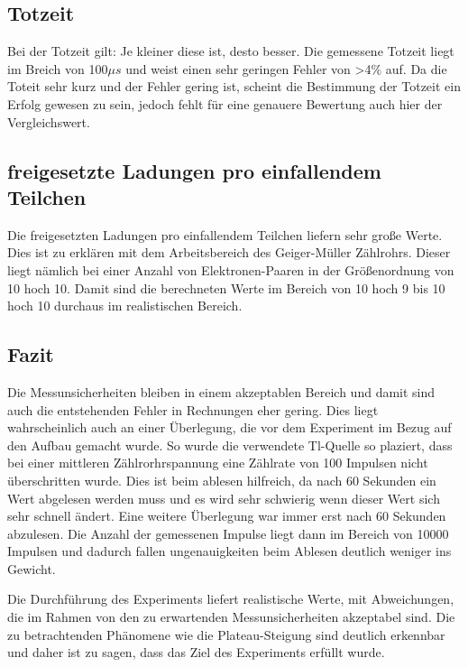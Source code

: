 \subsection{Totzeit}

Bei der Totzeit gilt: Je kleiner diese ist, desto besser.
Die gemessene Totzeit liegt im Breich von 100$\mu s$ 
und weist einen sehr geringen Fehler von >4$\%$ auf.
Da die Toteit sehr kurz und der Fehler gering ist,
scheint die Bestimmung der Totzeit ein Erfolg gewesen zu sein,
jedoch fehlt für eine genauere Bewertung auch hier der Vergleichswert.

\subsection{freigesetzte Ladungen pro einfallendem Teilchen}

Die freigesetzten Ladungen pro einfallendem Teilchen liefern sehr große Werte.
Dies ist zu erklären mit dem Arbeitsbereich des Geiger-Müller Zählrohrs.
Dieser liegt nämlich bei einer Anzahl von Elektronen-Paaren in der Größenordnung von 10 hoch 10.
Damit sind die berechneten Werte im Bereich von 10 hoch 9 bis 10 hoch 10 durchaus im realistischen Bereich.

\subsection{Fazit}

Die Messunsicherheiten bleiben in einem akzeptablen Bereich und damit sind auch die entstehenden Fehler in Rechnungen eher gering.
Dies liegt wahrscheinlich auch an einer Überlegung, die vor dem Experiment im Bezug auf den Aufbau gemacht wurde.
So wurde die verwendete Tl-Quelle so plaziert, 
dass bei einer mittleren Zählrorhrspannung eine Zählrate von 100 Impulsen nicht überschritten wurde.
Dies ist beim ablesen hilfreich, da nach 60 Sekunden ein Wert abgelesen werden muss
und es wird sehr schwierig wenn dieser Wert sich sehr schnell ändert.
Eine weitere Überlegung war immer erst nach 60 Sekunden abzulesen.
Die Anzahl der gemessenen Impulse liegt dann im Bereich von 10000 Impulsen
und dadurch fallen ungenauigkeiten beim Ablesen deutlich weniger ins Gewicht.

\noindent Die Durchführung des Experiments liefert realistische Werte,
mit Abweichungen, die im Rahmen von den zu erwartenden Messunsicherheiten akzeptabel sind.
Die zu betrachtenden Phänomene wie die Plateau-Steigung sind deutlich erkennbar 
und daher ist zu sagen, dass das Ziel des Experiments erfüllt wurde.

